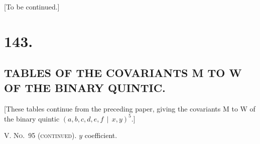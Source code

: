 \documentclass[11pt,a4paper]{book}
\begin{document}
\vspace{2ex}
\begin{center}
[To be continued.]
\
\clearpage


\setlength{\parindent}{1.5em}
\setlength{\parskip}{0pt plus 1pt}


\clearpage
\section*{143.}
\subsection*{TABLES OF THE COVARIANTS M TO W OF THE BINARY QUINTIC.}

[These tables continue from the preceding paper, giving the covariants M to W
of the binary quintic $(a, b, c, d, e, f \, \mid\, x, y)^5$.]

\bigskip
\noindent\textsc{V. No.~95 (continued).} $y$ coefficient.


\end{center}
\end{document}
